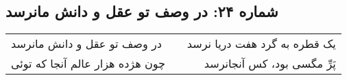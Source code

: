\begin{center}
\section*{شماره ۲۴: در وصف تو عقل و دانش مانرسد}
\label{sec:024}
\begin{longtable}{l p{0.5cm} r}
در وصف تو عقل و دانش مانرسد
&&
یک قطره به گرد هفت دریا نرسد
\\
چون هژده هزار عالم آنجا که توئی
&&
پَرِّ مگسی بود، کس آنجانرسد
\\
\end{longtable}
\end{center}
